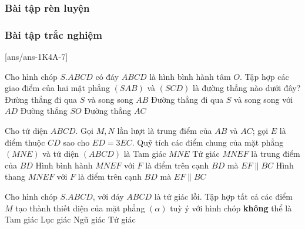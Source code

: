 \subsubsection{Bài tập rèn luyện}
\subsubsection{Bài tập trắc nghiệm}
[ans/ans-1K4A-7]
\begin{ex}%
	Cho hình chóp $S.ABCD$ có đáy $ABCD$ là hình bình hành tâm $O$. Tập hợp các giao điểm của hai mặt phẳng $(SAB)$ và $(SCD)$ là đường thẳng nào dưới đây?
	\choice
	{\True Đường thẳng đi qua $S$ và song song $AB$}
	{ Đường thẳng đi qua $S$ và song song với $AD$}
	{ Đường thẳng $SO$}
	{ Đường thẳng $AC$}
	\loigiai{
		
	}
\end{ex}
\begin{ex}%
	Cho tứ diện $ABCD$. Gọi $M,N$ lần lượt là trung điểm của $AB$ và $AC$; gọi $E$ là điểm thuộc $ CD $ sao cho $ ED=3EC $. Quỹ tích các điểm chung của mặt phẳng $ (MNE) $ và tứ diện $(ABCD)$ là
	\choice
	{ Tam giác $ MNE $}		
	{ Tứ giác $ MNEF $ là trung điểm của $ BD $}
	{ Hình bình hành $ MNEF $ với $ F $ là điểm trên cạnh $ BD $ mà $ EF \parallel BC $}
	{\True Hình thang $ MNEF $ với $ F $ là điểm trên cạnh $ BD $ mà $ EF \parallel BC $}
\end{ex}
\begin{ex}%
	Cho hình chóp $S.ABCD$, với đáy $ABCD$ là tứ giác lồi. Tập hợp tất cả các điểm $ M $ tạo thành thiết diện của mặt phẳng $( \alpha )$ tuỳ ý với hình chóp \textbf{không} thể là
	\choice
	{ Tam giác}
	{\True Lục giác}
	{ Ngũ giác}
	{ Tứ giác}
	\loigiai{
		
	}
\end{ex}
